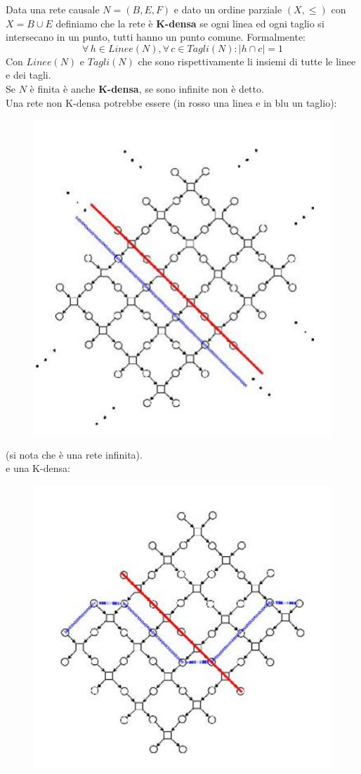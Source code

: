 \documentclass[a4paper,12pt, oneside]{book}
\begin{document}
\begin{definizione}
  Data una rete causale $N=(B,E,F)$ e dato un ordine parziale $(X, \leq)$ con
  $X=B\cup E$ definiamo che la rete è \textbf{K-densa} se ogni linea ed ogni
  taglio si intersecano in un punto, tutti hanno un punto comune. Formalmente:
  \[\forall\,h\in Linee(N),\forall\,c\in Tagli(N):|h\cap c|=1\]
  Con $Linee(N)$ e $Tagli(N)$ che sono rispettivamente li insiemi di tutte le
  linee e dei tagli.\\
  Se $N$ è finita è anche \textbf{K-densa}, se sono infinite non è detto.\\
  Una rete non K-densa potrebbe essere (in rosso una linea e in blu un taglio):
  \begin{figure}[H]
    \centering
    \includegraphics[scale = 0.36]{img/de1.jpg} 
  \end{figure}
  (si nota che è una rete infinita).\\
  e una K-densa:
  \begin{figure}[H]
    \centering
    \includegraphics[scale = 0.36]{img/de2.jpg} 

\end{figure}
\end{definizione}
\end{document}
